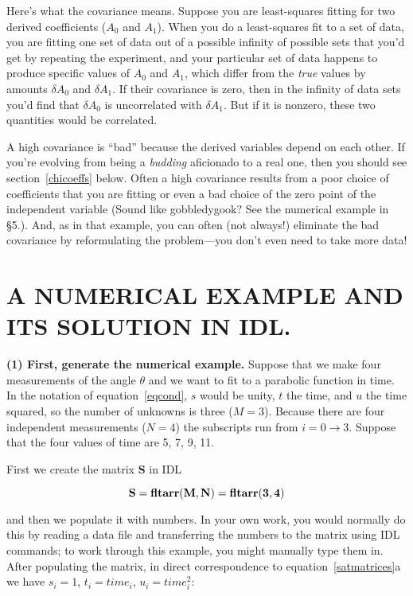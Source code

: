 	Here's what the covariance means.  Suppose you are least-squares
fitting for two derived coefficients ($A_0$ and $A_1$).  When you do a
least-squares fit to a set of data, you are fitting one set of data out
of a possible infinity of possible sets that you'd get by repeating the
experiment, and your particular set of data happens to produce specific
values of $A_0$ and $A_1$, which differ from the {\it true} values by
amounts $\delta A_0$ and $\delta A_1$.  If their covariance is zero,
then in the infinity of data sets you'd find that $\delta A_0$ is
uncorrelated with $\delta A_1$.  But if it is nonzero, these two
quantities would be correlated. 

	A high covariance is ``bad'' because the derived variables
depend on each other.  If you're evolving from being a {\it budding}
aficionado to a real one, then you should see section~\ref{chicoeffs}
below.  Often a high covariance results from a poor choice of
coefficients that you are fitting or even a bad choice of the zero point
of the independent variable (Sound like gobbledygook? See the numerical
example in \S5.).  And, as in that example, you can often (not always!)
eliminate the bad covariance by reformulating the problem---you don't
even need to take more data!

\section{A NUMERICAL EXAMPLE AND ITS SOLUTION IN IDL.}

	{\bf (1) First, generate the numerical example.} Suppose that we
make four measurements of the angle $\theta$ and we want to fit to a
parabolic function in time.  In the notation of equation~\ref{eqcond},
$s$ would be unity, $t$ the time, and $u$ the time squared, so the
number of unknowns is three ($M=3$).  Because there are four independent
measurements ($N=4$) the subscripts run from $i = 0 \rightarrow 3$. 
Suppose that the four values of time are 5, 7, 9, 11. 

	First we create the matrix {\bf S} in IDL

\begin{equation}
{\bf S = fltarr(M,N) = fltarr(3,4)}
\end{equation}
	
\noindent and then we populate it with numbers.  In your own work, you
would normally do this by reading a data file and transferring the
numbers to the matrix using IDL commands; to work through this example,
you might manually type them in.  After populating the matrix, in direct
correspondence to equation~\ref{satmatrices}a we have $s_i = 1$, $t_i =
time_i$, $u_i = time_i^2$:

